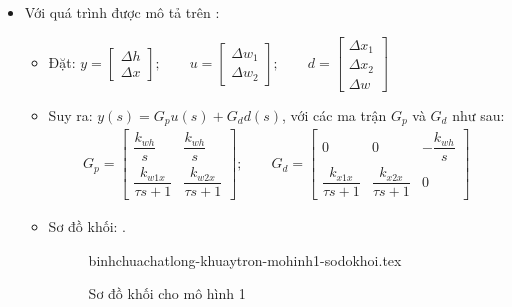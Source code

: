 \begin{itemize}
        \item Với quá trình được mô tả trên \fig{\ref{Fig:binhchuachatlong-khuaytron-mohinh1}}:
            \begin{itemize}
                \item Đặt: $y = \left[\begin{array}{c}\Delta h \\ \Delta x \end{array}\right]; \qquad u = \left[\begin{array}{c}\Delta w_1 \\ \Delta w_2 \end{array}\right]; \qquad d = \left[\begin{array}{c}\Delta x_1 \\ \Delta x_2 \\ \Delta w \end{array}\right]$
                \item Suy ra: $y(s) = G_p u(s) + G_d d(s)$, với các ma trận $G_p$ và $G_d$ như sau:
                    \begin{align*}
                        G_p = \left[\begin{array}{cc}\dfrac{k_{wh}}{s} & \dfrac{k_{wh}}{s} \\ \dfrac{k_{w1x}}{\tau s + 1} & \dfrac{k_{w2x}}{\tau s + 1} \end{array}\right]; \qquad G_d = \left[\begin{array}{ccc}0 & 0 & -\dfrac{k_{wh}}{s} \\ \dfrac{k_{x1x}}{\tau s + 1} & \dfrac{k_{x2x}}{\tau s + 1} & 0 \end{array}\right]
                    \end{align*}
                \item Sơ đồ khối: \fig{\ref{Fig:binhchuachatlong-khuaytron-mohinh1-sodokhoi}}.
                    \begin{figure}[!htp]
                        \begin{center}
                            {binhchuachatlong-khuaytron-mohinh1-sodokhoi.tex}
                        \end{center}
                        \caption{Sơ đồ khối cho mô hình 1} \label{Fig:binhchuachatlong-khuaytron-mohinh1-sodokhoi}
                    \end{figure}
            \end{itemize}


\end{itemize}
